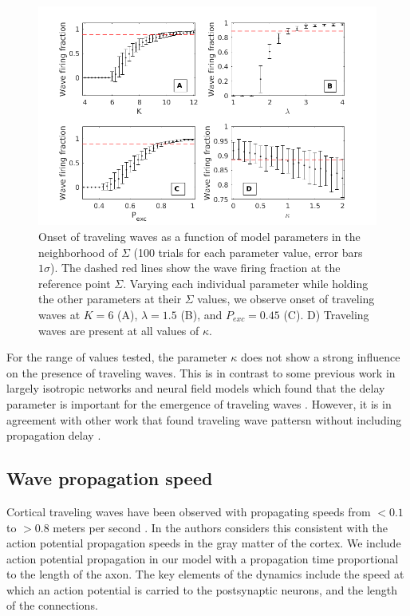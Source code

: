 \documentclass[12pt]{article}
\begin{document}
\begin{figure}[!htb]
 \centering
 \includegraphics[width=\textwidth]{fig/ParamWaveSim}
 \caption{Onset of traveling waves as a function of model parameters in the neighborhood of $\Sigma$ (100 trials for each parameter value, error bars $1\sigma$). 
         The dashed red lines show the wave firing fraction at the \color{red}reference \color{black} point $\Sigma$.  
         Varying each individual parameter while holding the other parameters at their $\Sigma$ values, we observe onset of traveling waves at $K=6$ (A), $\lambda=1.5$ (B), and $P_{exc}=0.45$ (C).  
         D) Traveling waves are present at all values of $\kappa$. }
 \label{fig:wave_parameters}
\end{figure}

\FloatBarrier

For the range of values tested, the parameter $\kappa$ does not show a strong influence on the presence of traveling waves. 
\color{red} This is in contrast to some previous work in largely isotropic networks and neural field models which found that the delay parameter is important for the emergence of traveling waves \parencite{Senk2020}\parencite{Atay2006}\parencite{Roxin2005}.
However, it is in agreement with other work that found traveling wave pattersn without including propagation delay \parencite{Folias2012}\parencite{Wyller2007}.
\color{black}

\subsection{Wave propagation speed} \label{sub:propagation_speed}
Cortical traveling waves have been observed with propagating speeds from \color{red}$<0.1$ to $>0.8$ meters per second \parencite{Sato2012}\parencite{Golomb1997}\parencite{Chervin1988}\color{black}.
\color{red}In \parencite{Muller2018} the authors considers this \color{black}consistent with the action potential propagation speeds in the gray matter of the cortex. 
We include action potential propagation in our model with a propagation\color{red}  time proportional to the length of the axon\color{black}.
The key elements of the dynamics include the speed at which an action potential is carried to the postsynaptic neurons, and the length of the connections.
\end{document}
